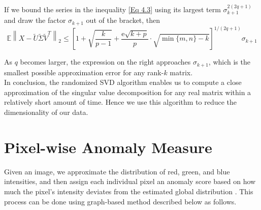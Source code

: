 \noindent If we bound the series in the inequality \ref{Eq 4.3} using its largest term $\sigma_{k+1}^{2(2q+1)}$ and draw the factor $\sigma_{k+1}$ out of the bracket, then
$$\mathbb { E } \left \| X - \widetilde{ U} \widetilde{\Sigma} \widetilde{V}^{T} \right\|_2 \leq \left[ 1 + \sqrt { \frac { k } { p - 1 } } + \frac { \mathrm { e } \sqrt { k + p } } { p } \cdot \sqrt { \min \{ m , n \} - k } \right] ^ { 1 / ( 2 q + 1 ) } \sigma _ { k + 1 }$$

\noindent
As $q$ becomes larger, the expression on the right approaches $ \sigma_{k+1}$, which is the smallest possible approximation error for any rank-$  k $ matrix.\\


\noindent In conclusion, the randomized SVD algorithm enables us to compute a close approximation of the singular value decomposition for any real matrix within a relatively short amount of time. Hence we use this algorithm to reduce the dimensionality of our data.

 
 
 
\section{Pixel-wise Anomaly Measure}

\noindent Given an image, we approximate the distribution of red, green, and blue intensities, and then assign each individual pixel an anomaly score based on how much the pixel's intensity deviates from the estimated global distribution \cite{RX_detector}. This process can be done using graph-based method described below \cite{graph_lap} as follows.\\

